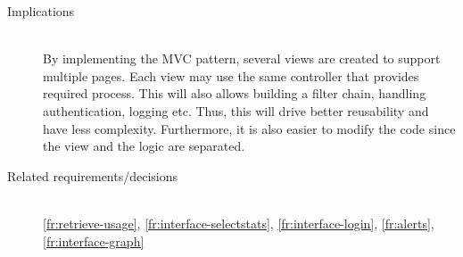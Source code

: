 \begin{description}
\begin{enumerate}
\end{enumerate}

\item [Implications]~\\
By implementing the MVC pattern, several views are created to support multiple pages. Each view may use the same controller that provides required process. This will also allows building a filter chain, handling authentication, logging etc. Thus, this will drive better reusability and have less complexity. Furthermore, it is also easier to modify the code since the view and the logic are separated.

\item [Related requirements/decisions]~\\
\ref{fr:retrieve-usage}, \ref{fr:interface-selectstats}, \ref{fr:interface-login}, \ref{fr:alerts}, \ref{fr:interface-graph} 

\end{description}



